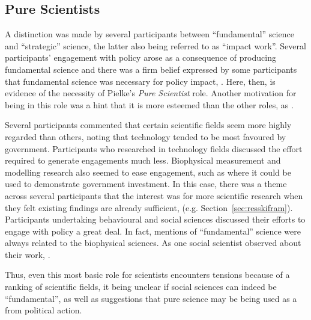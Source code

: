 \subsection{Pure Scientists}\label{sec:disscientist}
A distinction was made by several participants between ``fundamental'' science and ``strategic'' science, the latter also being referred to as ``impact work''. Several participants' engagement with policy arose as a consequence of producing fundamental science and there was a firm belief expressed by some participants that fundamental science was necessary for policy impact, . Here, then, is evidence of the necessity of Pielke's \emph{Pure Scientist} role. Another motivation for being in this role was a hint that it is more esteemed than the other roles, as . 

Several participants commented that certain scientific fields seem more highly regarded than others, noting that technology tended to be most favoured by government. Participants who researched in technology fields discussed the effort required to generate engagements much less. Biophysical measurement and modelling research also seemed to ease engagement, such as where it could be used to demonstrate government investment. In this case, there was a theme across several participants that the interest was for more scientific research when they felt existing findings are already sufficient,  (e.g. Section~\ref{sec:resskifram}). Participants undertaking behavioural and social sciences discussed their efforts to engage with policy a great deal. In fact, mentions of ``fundamental'' science were always related to the biophysical sciences. As one social scientist observed about their work, . 

Thus, even this most basic \SPI{} role for scientists encounters tensions because of a ranking of scientific fields, it being unclear if social sciences can indeed be ``fundamental'', as well as suggestions that pure science may be being used as a  from political action.

